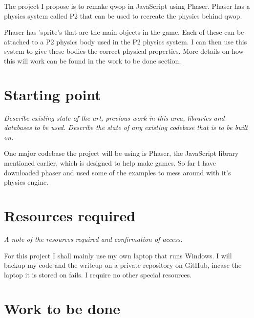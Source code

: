 \documentclass[12pt,a4paper,twoside]{article}
\begin{document}
The project I propose is to remake qwop in JavaScript using Phaser. Phaser has a physics system called P2 that can be used to recreate the physics behind qwop.

Phaser has 'sprite's that are the main objects in the game. Each of these can be attached to a P2 physics body used in the P2 physics system. I can then use this system to give these bodies the correct physical properties.
More details on how this will work can be found in the work to be done section.


 

\section*{Starting point}

\emph{Describe existing state of the art, previous work in this area, libraries and databases to be used. Describe the state of any existing codebase that is to be built on.}

One major codebase the project will be using is Phaser, the JavaScript library mentioned earlier, which is designed to help make games. So far I have downloaded phaser and used some of the examples to mess around with it's physics engine.

\section*{Resources required}

\emph{A note of the resources required and confirmation of access.}

For this project I shall mainly use my own laptop that runs Windows. I will backup my code and the writeup on a private repository on GitHub, incase the laptop it is stored on fails. I require no other special resources.

\section*{Work to be done}
\end{document}
